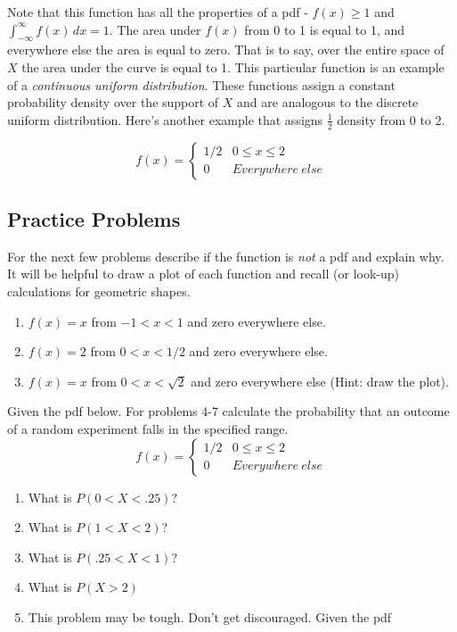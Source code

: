 \documentclass[
]{book}
\theoremstyle{definition}
\theoremstyle{definition}
\theoremstyle{definition}
\theoremstyle{definition}
\theoremstyle{remark}
\begin{document}
Note that this function has all the properties of a pdf - \(f(x) \geq 1\) and \(\int_{-\infty}^{\infty} f(x) \, dx = 1\). The area under \(f(x)\) from 0 to 1 is equal to 1, and everywhere else the area is equal to zero. That is to say, over the entire space of \(X\) the area under the curve is equal to 1. This particular function is an example of a \emph{continuous uniform distribution}. These functions assign a constant probability density over the support of \(X\) and are analogous to the discrete uniform distribution. Here's another example that assigns \(\frac{1}{2}\) density from 0 to 2.

\[
f(x) = 
\begin{cases}
1/2 & 0 \leq x \leq 2 \\
0 & Everywhere \: else
\end{cases}
\]

\subsection{Practice Problems}\label{practice-problems-1}

For the next few problems describe if the function is \emph{not} a pdf and explain why. It will be helpful to draw a plot of each function and recall (or look-up) calculations for geometric shapes.

\begin{enumerate}
\def\labelenumi{\arabic{enumi}.}
\item
  \(f(x) = x\) from \(-1 < x < 1\) and zero everywhere else.
\item
  \(f(x) = 2\) from \(0 < x < 1/2\) and zero everywhere else.
\item
  \(f(x) = x\) from \(0 < x < \sqrt{2}\) and zero everywhere else (Hint: draw the plot).
\end{enumerate}

Given the pdf below. For problems 4-7 calculate the probability that an outcome of a random experiment falls in the specified range.
\[
f(x) = 
\begin{cases}
1/2 & 0 \leq x \leq 2 \\
0 & Everywhere \: else
\end{cases}
\]

\begin{enumerate}
\def\labelenumi{\arabic{enumi}.}
\setcounter{enumi}{3}
\item
  What is \(P(0 < X < .25)\)?
\item
  What is \(P(1 < X < 2)\)?
\item
  What is \(P(.25 < X < 1)\)?
\item
  What is \(P(X > 2)\)
\item
  This problem may be tough. Don't get discouraged. Given the pdf
\end{enumerate}
\end{document}
